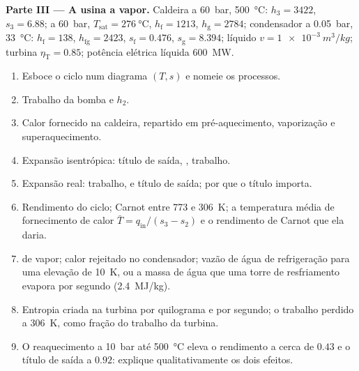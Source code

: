 \begin{problem}
\textbf{Parte III --- A usina a vapor.}
Caldeira a \qty{60}{bar}, \qty{500}{\celsius}: $h_3 = 3422$, $s_3 = 6.88$; a
\qty{60}{bar}, $T_{\text{sat}} = \qty{276}{\celsius}$, $h_{\text{f}} = 1213$,
$h_{\text{g}} = 2784$; condensador a \qty{0.05}{bar}, \qty{33}{\celsius}:
$h_{\text{f}} = 138$, $h_{\text{fg}} = 2423$, $s_{\text{f}} = 0.476$, $s_{\text{g}} =
8.394$; líquido $v = \qty{1e-3}{m^3/kg}$; turbina $\eta_{\text{T}} = 0.85$;
potência elétrica líquida \qty{600}{MW}.
\begin{enumerate}[resume]
  \item Esboce o ciclo num diagrama $(T,s)$ e nomeie os processos.
  \item Trabalho da bomba e $h_2$.
  \item Calor fornecido na caldeira, repartido em pré-aquecimento, vaporização
        e superaquecimento.
  \item Expansão isentrópica: título de saída, , trabalho.
  \item Expansão real: trabalho,  e título de saída; por que o
        título importa.
  \item Rendimento do ciclo; Carnot entre \qty{773}{} e \qty{306}{K};
        a temperatura média de fornecimento de calor $\bar T = q_{\text{in}}/(s_3
        - s_2)$ e o rendimento de Carnot que ela daria.
  \item {} de vapor; calor rejeitado no condensador; vazão de
        água de refrigeração para uma elevação de \qty{10}{K}, ou a massa de água que uma torre
        de resfriamento evapora por segundo (\qty{2.4}{MJ/kg}).
  \item Entropia criada na turbina por quilograma e por segundo;
        o trabalho perdido a \qty{306}{K}, como fração do trabalho da
        turbina.
  \item O reaquecimento a \qty{10}{bar} até \qty{500}{\celsius} eleva o
        rendimento a cerca de $0.43$ e o título de saída a $0.92$:
        explique qualitativamente os dois efeitos.
\end{enumerate}


\end{problem}
